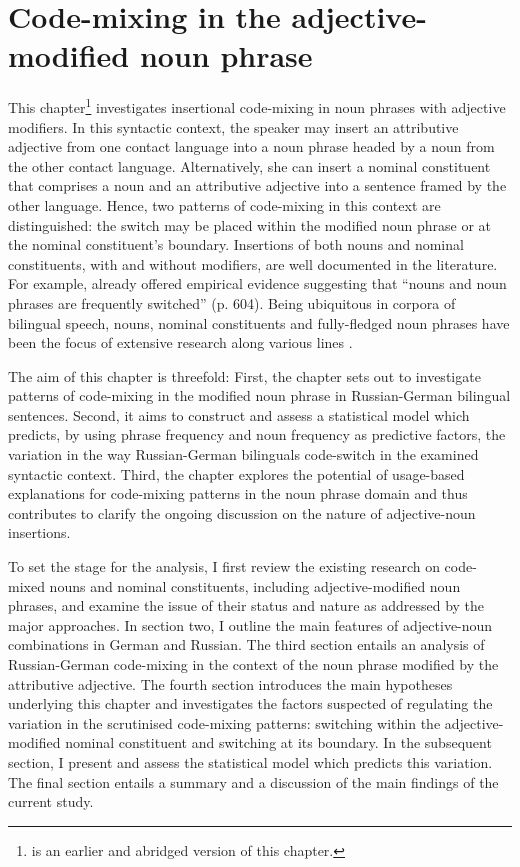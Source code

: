 \chapter{Code-mixing in the adjective-modified noun phrase}\label{NP}

This chapter\footnote{\citet{hakimov-20} is an earlier and abridged version of this chapter.} investigates insertional code-mixing in noun phrases with adjective modifiers. In this syntactic context, the speaker may insert an attributive adjective from one contact language into a noun phrase headed by a noun from the other contact language. Alternatively, she can insert a nominal constituent that comprises a noun and an attributive adjective into a sentence framed by the other language. Hence, two patterns of code-mixing in this context are distinguished: the switch may be placed within the modified noun phrase or at the nominal constituent's boundary. Insertions of both nouns and nominal constituents, with and without modifiers, are well documented in the literature. For example, already \citet{poplack-sometimes-1980} offered empirical evidence suggesting that ``nouns and noun phrases are frequently switched'' (p. 604). Being ubiquitous in corpora of bilingual speech, nouns, nominal constituents and fully-fledged noun phrases have been the focus of extensive research along various lines \citep[e.g.,][]{sankoff-et-al-1990,poplack-meechan-1995, cantone-macswan,parafita-couto-et-al}.

The aim of this chapter is threefold: First, the chapter sets out to investigate patterns of code-mixing in the modified noun phrase in Russian-German bilingual sentences. Second, it aims to construct and assess a statistical model which predicts, by using phrase frequency and noun frequency as predictive factors, the variation in the way Russian-German bilinguals code-switch in the examined syntactic context. Third, the chapter explores the potential of usage-based explanations for code-mixing patterns in the noun phrase domain and thus contributes to clarify the ongoing discussion on the nature of adjective-noun insertions.

\begin{sloppypar}
To set the stage for the analysis, I first review the existing research on code-mixed nouns and nominal constituents, including adjective-modified noun phrases, and examine the issue of their status and nature as addressed by the major approaches. In section two, I outline the main features of adjective-noun combinations in German and Russian. The third section entails an analysis of Russian-German code-mixing in the context of the noun phrase modified by the attributive adjective. The fourth section introduces the main hypotheses underlying this chapter and investigates the factors suspected of regulating the variation in the scrutinised code-mixing patterns: switching within the adjective-modified nominal constituent and switching at its boundary. In the subsequent section, I present and assess the statistical model which predicts this variation. The final section entails a summary and a discussion of the main findings of the current study.
\end{sloppypar}

